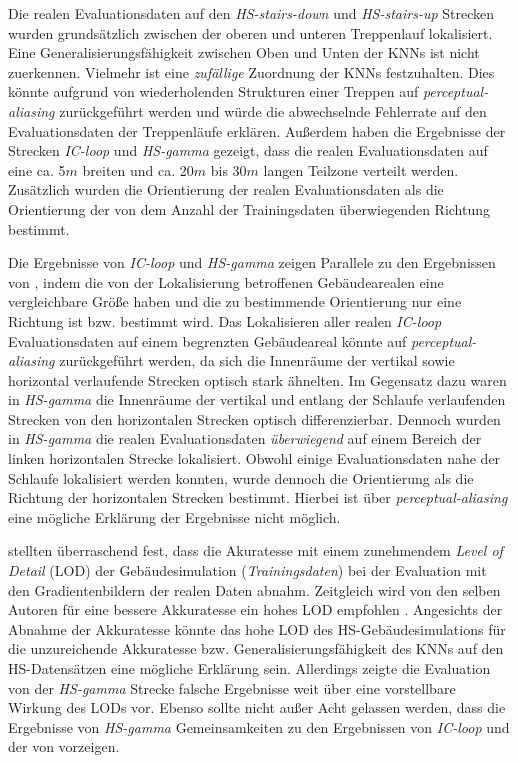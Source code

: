 Die realen Evaluationsdaten auf den \textit{HS-stairs-down} und \textit{HS-stairs-up} Strecken wurden grundsätzlich zwischen der oberen und unteren Treppenlauf lokalisiert. Eine Generalisierungsfähigkeit zwischen Oben und Unten der KNNs ist nicht zuerkennen. Vielmehr ist eine \textit{zufällige} Zuordnung der KNNs festzuhalten. Dies könnte aufgrund von wiederholenden Strukturen einer Treppen auf \textit{perceptual-aliasing} zurückgeführt werden und würde die abwechselnde Fehlerrate auf den Evaluationsdaten der Treppenläufe erklären.
Außerdem haben die Ergebnisse der Strecken \textit{IC-loop} und \textit{HS-gamma} gezeigt, dass die realen Evaluationsdaten auf eine ca. 5$m$ breiten und ca. 20$m$ bis 30$m$ langen Teilzone verteilt werden. Zusätzlich wurden die Orientierung der realen Evaluationsdaten als die Orientierung der von dem Anzahl der Trainingsdaten überwiegenden Richtung bestimmt. 


Die Ergebnisse von \textit{IC-loop} und \textit{HS-gamma} zeigen Parallele zu den Ergebnissen von \citet{acharyaBIMPoseNetIndoorCamera2019}, indem die von der Lokalisierung betroffenen Gebäudearealen eine vergleichbare Größe haben und die zu bestimmende Orientierung nur eine Richtung ist bzw. bestimmt wird.
Das Lokalisieren aller realen \textit{IC-loop} Evaluationsdaten auf einem begrenzten Gebäudeareal könnte auf \textit{perceptual-aliasing} zurückgeführt werden, da sich die Innenräume der vertikal sowie horizontal verlaufende Strecken optisch stark ähnelten. Im Gegensatz dazu waren in \textit{HS-gamma} die Innenräume der vertikal und entlang der Schlaufe verlaufenden Strecken von den horizontalen Strecken optisch differenzierbar. Dennoch wurden in \textit{HS-gamma} die realen Evaluationsdaten \textit{überwiegend} auf einem Bereich der linken horizontalen Strecke lokalisiert. Obwohl einige Evaluationsdaten nahe der Schlaufe lokalisiert werden konnten, wurde dennoch die Orientierung als die Richtung der horizontalen Strecken bestimmt. Hierbei ist über \textit{perceptual-aliasing} eine mögliche Erklärung der Ergebnisse nicht möglich.

\citet{acharyaBIMPoseNetIndoorCamera2019} stellten überraschend fest, dass die Akuratesse mit einem zunehmendem \textit{Level of Detail} (LOD) der Gebäudesimulation (\textit{Trainingsdaten}) bei der Evaluation mit den Gradientenbildern der realen Daten abnahm. Zeitgleich wird von den selben Autoren für eine bessere Akkuratesse ein hohes LOD empfohlen \cite{acharyaBIMPoseNetIndoorCamera2019}. Angesichts der Abnahme der Akkuratesse könnte das hohe LOD des HS-Gebäudesimulations für die unzureichende Akkuratesse bzw. Generalisierungsfähigkeit des KNNs auf den HS-Datensätzen eine mögliche Erklärung sein. Allerdings zeigte die Evaluation von der \textit{HS-gamma} Strecke falsche Ergebnisse weit über eine vorstellbare Wirkung des LODs vor. Ebenso sollte nicht außer Acht gelassen werden, dass die Ergebnisse von \textit{HS-gamma} Gemeinsamkeiten zu den Ergebnissen von \textit{IC-loop} und der von \citet{acharyaBIMPoseNetIndoorCamera2019} vorzeigen.

